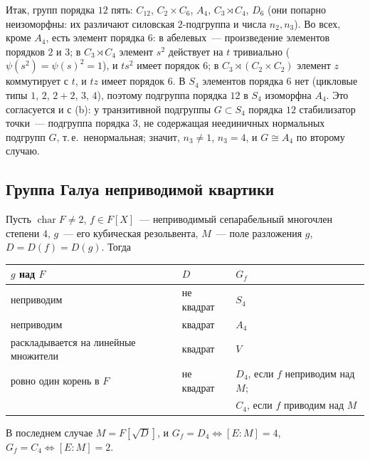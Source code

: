 \begin{remark}
\begin{itemize}
\end{itemize}
Итак, групп порядка $12$ пять: $C_{12}$, $C_2\times C_6$, $A_4$, $C_3\rtimes C_4$, $D_6$ (они попарно неизоморфны: их различают
силовская $2$-подгруппа и числа $n_2,n_3$). Во всех, кроме $A_4$, есть элемент порядка $6$: в абелевых~--- произведение
элементов порядков $2$ и $3$; в $C_3\rtimes C_4$ элемент $s^2$ действует на $t$ тривиально ($\psi(s^2)=\psi(s)^2=1$), и $ts^2$ имеет
порядок $6$; в $C_3\rtimes(C_2\times C_2)$ элемент $z$ коммутирует с $t$, и $tz$ имеет порядок $6$. В $S_4$ элементов порядка $6$ нет
(цикловые типы $1$, $2$, $2+2$, $3$, $4$), поэтому подгруппа порядка $12$ в $S_4$ изоморфна $A_4$. Это согласуется и с (b):
у транзитивной подгруппы $G\subset S_4$ порядка $12$ стабилизатор точки~--- подгруппа порядка $3$, не содержащая неединичных
нормальных подгрупп $G$, т.\,е.\ ненормальная; значит, $n_3\ne1$, $n_3=4$, и $G\cong A_4$ по второму случаю.
\end{remark}

\subsection*{Группа Галуа неприводимой квартики}

\begin{theorem}[4.9d]
Пусть $\operatorname{char}F\ne2$, $f\in F[X]$~--- неприводимый сепарабельный многочлен степени $4$, $g$~--- его кубическая
резольвента, $M$~--- поле разложения $g$, $D=D(f)=D(g)$. Тогда
\begin{center}
\begin{tabular}{@{}lll@{}}
\toprule
$g$ над $F$ & $D$ & $G_f$\\
\midrule
неприводим & не квадрат & $S_4$\\
неприводим & квадрат & $A_4$\\
раскладывается на линейные множители & квадрат & $V$\\
ровно один корень в $F$ & не квадрат & $D_4$, если $f$ неприводим над $M$;\\
 & & $C_4$, если $f$ приводим над $M$\\
\bottomrule
\end{tabular}
\end{center}
В последнем случае $M=F[\sqrt D]$, и $G_f=D_4\iff[E:M]=4$, $G_f=C_4\iff[E:M]=2$.
\end{theorem}

